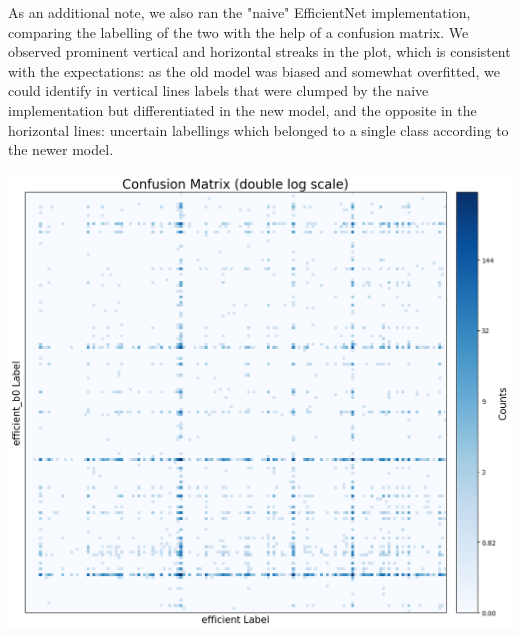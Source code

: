 \documentclass[10pt]{article}
\begin{document}
\begin{minipage}{0.65\linewidth}
As an additional note, we also ran the "naive" EfficientNet implementation, comparing the labelling of the two with the help of a confusion matrix. We observed prominent vertical and horizontal streaks in the plot, which is consistent with the expectations: as the old model was biased and somewhat overfitted, we could identify in vertical lines labels that were clumped by the naive implementation but differentiated in the new model, and the opposite in the horizontal lines: uncertain labellings which belonged to a single class according to the newer model.
\end{minipage}
\hfill
\begin{minipage}{0.30\linewidth}
  \includegraphics[width=\linewidth]{img/confusion_matrix_efficient_models.png}
\end{minipage}

\vspace{1em}
\end{document}
